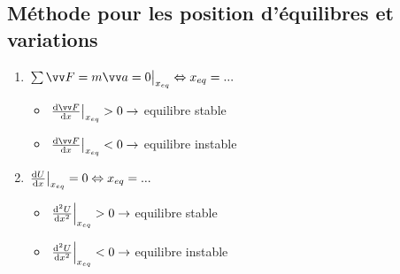 \documentclass[../main.tex]{subfiles}
\begin{document}
\subsection{Méthode pour les position d'équilibres et variations}
\begin{enumerate}
  \item \( \eval{\sum\F = m\ac = 0 }_{x_{eq}} \Leftrightarrow x_{eq} = ... \)
    \begin{itemize}
      \item \( \eval{\dv{\F}{x}}_{x_{eq}} > 0 \rightarrow \) equilibre stable
      \item \( \eval{\dv{\F}{x}}_{x_{eq}} < 0 \rightarrow \) equilibre instable
    \end{itemize}
\item \( \eval{\dv{U}{x}}_{x_{eq}} = 0  \Leftrightarrow x_{eq} = ... \)
    \begin{itemize}
      \item \( \eval{\dv[2]{U}{x}}_{x_{eq}} > 0 \rightarrow \) equilibre stable
      \item \( \eval{\dv[2]{U}{x}}_{x_{eq}} < 0 \rightarrow \) equilibre instable
    \end{itemize}
\end{enumerate}
\end{document}

